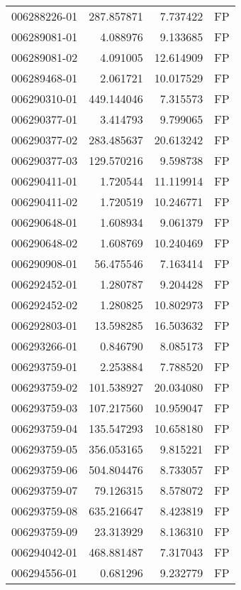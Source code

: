 \begin{tabular}{lrrl}
006288226-01 &  287.857871 &       7.737422 &   FP \\
006289081-01 &    4.088976 &       9.133685 &   FP \\
006289081-02 &    4.091005 &      12.614909 &   FP \\
006289468-01 &    2.061721 &      10.017529 &   FP \\
006290310-01 &  449.144046 &       7.315573 &   FP \\
006290377-01 &    3.414793 &       9.799065 &   FP \\
006290377-02 &  283.485637 &      20.613242 &   FP \\
006290377-03 &  129.570216 &       9.598738 &   FP \\
006290411-01 &    1.720544 &      11.119914 &   FP \\
006290411-02 &    1.720519 &      10.246771 &   FP \\
006290648-01 &    1.608934 &       9.061379 &   FP \\
006290648-02 &    1.608769 &      10.240469 &   FP \\
006290908-01 &   56.475546 &       7.163414 &   FP \\
006292452-01 &    1.280787 &       9.204428 &   FP \\
006292452-02 &    1.280825 &      10.802973 &   FP \\
006292803-01 &   13.598285 &      16.503632 &   FP \\
006293266-01 &    0.846790 &       8.085173 &   FP \\
006293759-01 &    2.253884 &       7.788520 &   FP \\
006293759-02 &  101.538927 &      20.034080 &   FP \\
006293759-03 &  107.217560 &      10.959047 &   FP \\
006293759-04 &  135.547293 &      10.658180 &   FP \\
006293759-05 &  356.053165 &       9.815221 &   FP \\
006293759-06 &  504.804476 &       8.733057 &   FP \\
006293759-07 &   79.126315 &       8.578072 &   FP \\
006293759-08 &  635.216647 &       8.423819 &   FP \\
006293759-09 &   23.313929 &       8.136310 &   FP \\
006294042-01 &  468.881487 &       7.317043 &   FP \\
006294556-01 &    0.681296 &       9.232779 &   FP \\

\end{tabular}
